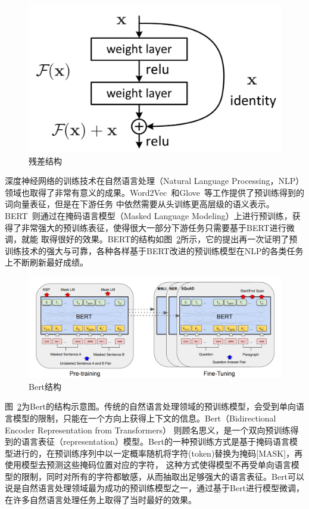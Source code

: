 
\begin{figure}
    \centering
    \includegraphics[width=0.5\linewidth]{figures/residual.png}
    \caption{残差结构~\citep{he2016deep}}
    \label{fig:residual}
\end{figure}

深度神经网络的训练技术在自然语言处理（Natural Language Processing，NLP）领域也取得了非常有意义的成果。Word2Vec~\citep{mikolov2013distributed}和Glove~\citep{pennington2014glove}等工作提供了预训练得到的词向量表征，但是在下游任务
中依然需要从头训练更高层级的语义表示。BERT~\citep{devlin2019bert}则通过在掩码语言模型（Masked Language Modeling）上进行预训练，获得了非常强大的预训练表征，使得很大一部分下游任务只需要基于BERT进行微调，就能
取得很好的效果。BERT的结构如图~\ref{fig:bert}所示，它的提出再一次证明了预训练技术的强大与可靠，各种各样基于BERT改进的预训练模型在NLP的各类任务上不断刷新最好成绩。

\begin{figure}
    \centering
    \includegraphics[width=\linewidth]{figures/bert.png}
    \caption{Bert结构~\citep{devlin2019bert}}
    \label{fig:bert}
\end{figure}

图~\ref{fig:bert}为Bert的结构示意图。传统的自然语言处理领域的预训练模型，会受到单向语言模型的限制，只能在一个方向上获得上下文的信息。Bert（Bidirectional Encoder Representation from Transformers）
则顾名思义，是一个双向预训练得到的语言表征（representation）模型。Bert的一种预训练方式是基于掩码语言模型进行的，在预训练序列中以一定概率随机将字符(token)替换为掩码[MASK]，再使用模型去预测这些掩码位置对应的字符，
这种方式使得模型不再受单向语言模型的限制，同时对所有的字符都敏感，从而抽取出足够强大的语言表征。Bert可以说是自然语言处理领域最为成功的预训练模型之一，通过基于Bert进行模型微调，在许多自然语言处理任务上取得了当时最好的效果。

